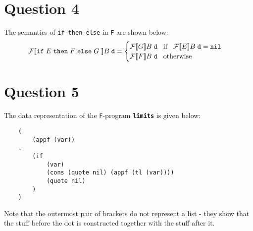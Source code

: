 \documentclass{article}
\begin{document}
\section*{Question 4}
The semantics of \texttt{if-then-else} in \texttt{F} are shown below:
\begin{equation*}
    \mathcal{F} [\![ \texttt{if} \hspace{1mm} E \hspace{1mm} \texttt{then} \hspace{1mm} F \hspace{1mm} \texttt{else} \hspace{1mm} G \hspace{1mm} ]\!] B \hspace{1mm} \texttt{d} = \begin{cases}
        \mathcal{F} [\![ G ]\!] B \hspace{1mm} \texttt{d} \hspace{3mm} \text{if} \hspace{3mm} \mathcal{F} [\![ E ]\!] B \hspace{1mm} \texttt{d} = \texttt{nil} \\
        \mathcal{F} [\![ F ]\!] B \hspace{1mm} \texttt{d} \hspace{3mm} \text{otherwise}
    \end{cases}
\end{equation*}

\section*{Question 5}
The data representation of the \texttt{F}-program \textbf{\texttt{limits}} is given below:
\begin{verbatim}
    (
        (appf (var))
    .
        (if
            (var)
            (cons (quote nil) (appf (tl (var))))
            (quote nil)
        )
    )
\end{verbatim}
Note that the outermost pair of brackets do not represent a list - they show that the stuff before the dot is constructed together with the stuff after it.
\end{document}
